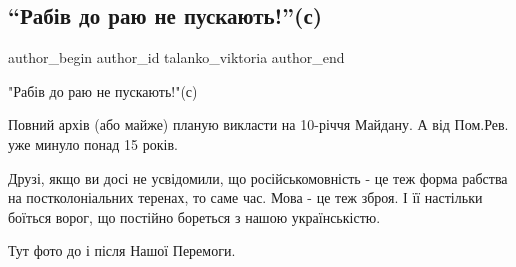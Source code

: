  
 
 
 
 
 
\subsection{\enquote{Рабів до раю не пускають!}(с)}
\label{sec:21_11_2021.fb.talanko_viktoria.1.maidan_foto}
 
\ifcmt
 author_begin
   author_id talanko_viktoria
 author_end
\fi

"Рабів до раю не пускають!"(с)

Повний архів (або майже) планую викласти на 10-річчя Майдану. А від Пом.Рев.
уже минуло понад 15 років.


Друзі, якщо ви досі не усвідомили, що російськомовність - це теж форма рабства
на постколоніальних теренах, то саме час. Мова - це теж зброя. І її настільки
боїться ворог, що постійно бореться з нашою українськістю.


Тут фото до і після Нашої Перемоги.

